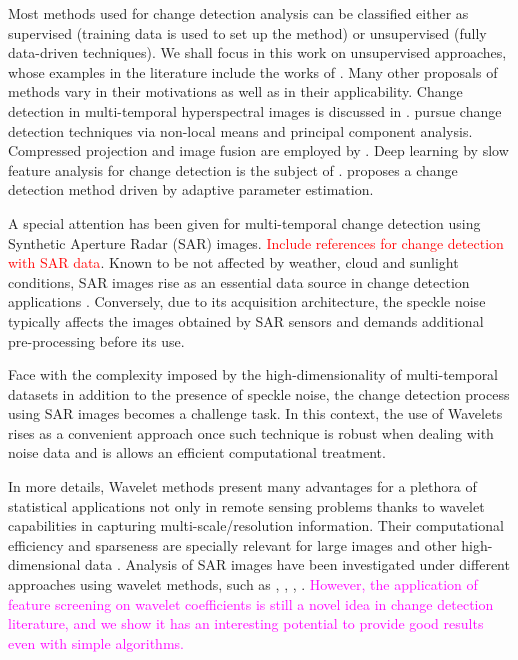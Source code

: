 \documentclass[journal]{IEEEtran}
\begin{document}
Most methods used for change detection analysis can be classified either as supervised (training data is used to set up the method) or unsupervised (fully data-driven techniques). We shall focus in this work on unsupervised approaches, whose examples in the literature include the works of \cite{bruzzone2000automatic,celik2010change,quin2014mimosa,saha2020change,NegriEA2021,NegriFrery2021}. Many other proposals of methods vary in their motivations as well as in their applicability.  Change detection in multi-temporal hyperspectral images is discussed in \cite{bovolo2015time,liu2019review,matsunaga2017current}.  \cite{jia2018novel} pursue change detection techniques via non-local means and principal component analysis. Compressed projection and image fusion are employed by \cite{hou2014unsupervised}. Deep learning by slow feature analysis for change detection is the subject of \cite{du2019unsupervised}. \cite{chen2020change} proposes a change detection method driven by adaptive parameter estimation.


A special attention has been given for multi-temporal change detection using Synthetic Aperture Radar (SAR) images. \textcolor{red}{Include references for change detection with SAR data}. 
Known to be not affected by weather, cloud and sunlight conditions, SAR images rise as an essential data source in change detection applications \cite{bovolo2005detail}.
Conversely, due to its acquisition architecture, the speckle noise typically affects the images obtained by SAR sensors and demands additional pre-processing before its use.



Face with the complexity imposed by the high-dimensionality of multi-temporal datasets in addition to the presence of speckle noise, the change detection process using SAR images becomes a challenge task.
In this context, the use of Wavelets rises as a convenient approach once such technique is robust when dealing with noise data and is allows an efficient computational treatment. 



In more details, Wavelet methods present many advantages for a plethora of statistical applications \cite{vidakovic1999statistical} not only in remote sensing problems thanks to wavelet capabilities in capturing multi-scale/resolution information. 
Their computational efficiency and sparseness are specially relevant for large images and other high-dimensional data \cite{morettin2017wavelets}. 
Analysis of SAR images have been investigated under different approaches using wavelet methods, such as \cite{atto2012multidate}, \cite{bouhlel2015multivariate}, \cite{celik2009multiscale}, \cite{cui2012statistical}. 
\textcolor{magenta}{However, the application of feature screening on wavelet coefficients is still a novel idea in change detection literature, and we show it has an interesting potential to provide good results even with simple algorithms.}
\end{document}
